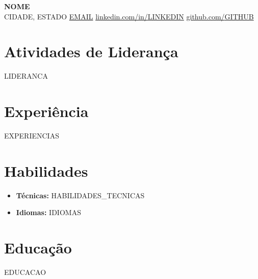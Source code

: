 \documentclass[a4paper,10pt]{article}
\begin{document}
\begin{center}
	{\LARGE \textbf{{{NOME}}}} \\
	[0.1cm]
	{{CIDADE}}, {{ESTADO}} {\textbullet}
	\href{mailto:{{EMAIL}}}{{{EMAIL}}} {\textbullet}
	\href{https://linkedin.com/in/{{LINKEDIN}}}{linkedin.com/in/{{LINKEDIN}}} {\textbullet}
	\href{https://github.com/{{GITHUB}}}{github.com/{{GITHUB}}}
\end{center}
\section{Atividades de Liderança}
{{LIDERANCA}}
\section{Experiência}
{{EXPERIENCIAS}}
\section{Habilidades}
\begin{itemize}
	\item \textbf{Técnicas:} {{HABILIDADES_TECNICAS}}
	\item \textbf{Idiomas:} {{IDIOMAS}}
\end{itemize}
\section{Educação}
{{EDUCACAO}}
\end{document}
